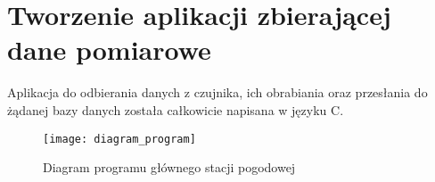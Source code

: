 \chapter{Tworzenie aplikacji zbierającej dane pomiarowe}

Aplikacja do odbierania danych z czujnika, ich obrabiania oraz przesłania do żądanej bazy danych została całkowicie napisana w języku C.

\begin{figure}[h]
\centering
\texttt{[image: diagram\_program]}
\caption{Diagram programu głównego stacji pogodowej}
\label{fig:diagram_program}
\end{figure}